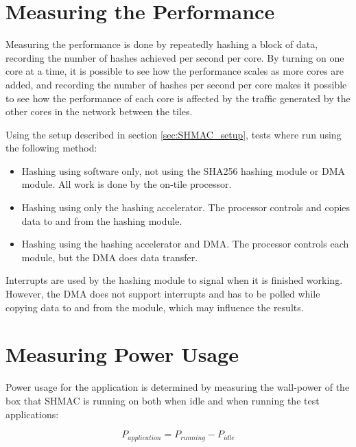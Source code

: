 \section{Measuring the Performance}

Measuring the performance is done by repeatedly hashing a block of data, recording the
number of hashes achieved per second per core. By turning on one core at a time, it
is possible to see how the performance scales as more cores are added, and recording
the number of hashes per second per core makes it possible to see how the performance
of each core is affected by the traffic generated by the other cores in the network
between the tiles.

Using the setup described in section \ref{sec:SHMAC_setup}, tests where run using the
following method:

\begin{itemize}
    \item Hashing using software only, not using the SHA256 hashing module or DMA module.
    All work is done by the on-tile processor.
    \item Hashing using only the hashing accelerator.
    The processor controls and copies data to and from the hashing module.
    \item Hashing using the hashing accelerator and DMA.
    The processor controls each module, but the DMA does data transfer.
\end{itemize}

Interrupts are used by the hashing module to signal when it is finished working. However,
the DMA does not support interrupts and has to be polled while copying data to and from
the module, which may influence the results.

\section{Measuring Power Usage}

Power usage for the application is determined by measuring the wall-power of the box
that SHMAC is running on both when idle and when running the test applications:

\[P_{application} = P_{running} - P_{idle}\]

